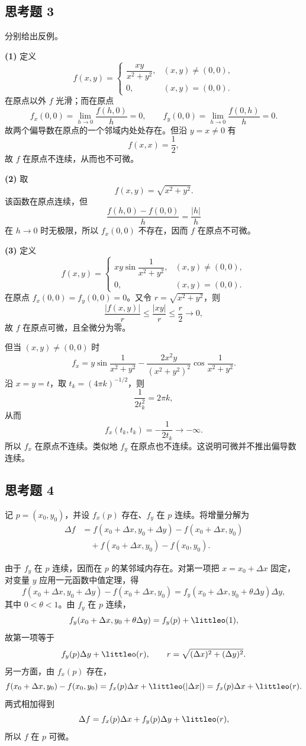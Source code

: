 \subsection*{思考题 3}
\begin{xsolution}
分别给出反例。

\textbf{(1)} 定义
\[
  f(x,y)=
  \begin{cases}
    \dfrac{xy}{x^2+y^2},&(x,y)\ne(0,0),\\
    0,&(x,y)=(0,0).
  \end{cases}
\]
在原点以外 $f$ 光滑；而在原点
\[
  f_x(0,0)=\lim_{h\to0}\frac{f(h,0)}h=0,
  \qquad
  f_y(0,0)=\lim_{h\to0}\frac{f(0,h)}h=0.
\]
故两个偏导数在原点的一个邻域内处处存在。但沿 $y=x\ne0$ 有
\[
  f(x,x)=\frac12,
\]
故 $f$ 在原点不连续，从而也不可微。

\textbf{(2)} 取
\[
  f(x,y)=\sqrt{x^2+y^2}.
\]
该函数在原点连续，但
\[
  \frac{f(h,0)-f(0,0)}h=\frac{|h|}{h}
\]
在 $h\to0$ 时无极限，所以 $f_x(0,0)$ 不存在，因而 $f$ 在原点不可微。

\textbf{(3)} 定义
\[
  f(x,y)=
  \begin{cases}
    xy\sin\dfrac1{x^2+y^2},&(x,y)\ne(0,0),\\
    0,&(x,y)=(0,0).
  \end{cases}
\]
在原点 $f_x(0,0)=f_y(0,0)=0$。又令 $r=\sqrt{x^2+y^2}$，则
\[
  \frac{|f(x,y)|}{r}
  \le\frac{|xy|}{r}
  \le\frac{r}{2}\to0,
\]
故 $f$ 在原点可微，且全微分为零。

但当 $(x,y)\ne(0,0)$ 时
\[
  f_x=y\sin\frac1{x^2+y^2}
  -\frac{2x^2y}{(x^2+y^2)^2}\cos\frac1{x^2+y^2}.
\]
沿 $x=y=t$，取 $t_k=(4\pi k)^{-1/2}$，则
\[
  \frac1{2t_k^2}=2\pi k,
\]
从而
\[
  f_x(t_k,t_k)=-\frac1{2t_k}\to-\infty.
\]
所以 $f_x$ 在原点不连续。类似地 $f_y$ 在原点也不连续。这说明可微并不推出偏导数连续。
\end{xsolution}

\subsection*{思考题 4}
\begin{xsolution}
记 $p=(x_0,y_0)$，并设 $f_x(p)$ 存在、$f_y$ 在 $p$ 连续。将增量分解为
\begin{align*}
  \Delta f
  &=f(x_0+\Delta x,y_0+\Delta y)-f(x_0+\Delta x,y_0)\\
  &\quad+f(x_0+\Delta x,y_0)-f(x_0,y_0).
\end{align*}

由于 $f_y$ 在 $p$ 连续，因而在 $p$ 的某邻域内存在。对第一项把 $x=x_0+\Delta x$ 固定，对变量 $y$ 应用一元函数中值定理，得
\[
  f(x_0+\Delta x,y_0+\Delta y)-f(x_0+\Delta x,y_0)
  =f_y(x_0+\Delta x,y_0+\theta\Delta y)\Delta y,
\]
其中 $0<\theta<1$。由 $f_y$ 在 $p$ 连续，
\[
  f_y(x_0+\Delta x,y_0+\theta\Delta y)
  =f_y(p)+\littleo(1),
\]
故第一项等于
\[
  f_y(p)\Delta y+\littleo(r),
  \qquad r=\sqrt{(\Delta x)^2+(\Delta y)^2}.
\]
另一方面，由 $f_x(p)$ 存在，
\[
  f(x_0+\Delta x,y_0)-f(x_0,y_0)
  =f_x(p)\Delta x+\littleo(|\Delta x|)
  =f_x(p)\Delta x+\littleo(r).
\]
两式相加得到
\[
  \Delta f=f_x(p)\Delta x+f_y(p)\Delta y+\littleo(r),
\]
所以 $f$ 在 $p$ 可微。
\end{xsolution}

